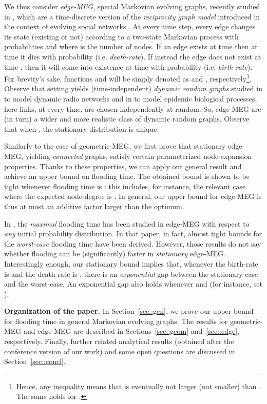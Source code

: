 \documentclass[10pt,a4paper]{article}
\begin{document}
We thus consider \emph{edge-MEG}, special Markovian evolving graphs, recently studied in \cite{CMMPS08,BCF09}, which are a time-discrete version of the \emph{reciprocity graph model} introduced in the context of evolving social networks \cite{W80}. At every time step, every edge changes its state (existing or not) according to a two-state Markovian process with probabilities  and  where  is the number of nodes. If an edge exists at time  then at time  it dies with probability  (i.e. \emph{death-rate}). If instead the edge does not exist at time , then it will come into existence at time  with probability  (i.e. \emph{birth-rate}). For brevity's sake, functions  and  will be simply denoted as  and , respectively\footnote{Hence, any inequality  means that  is eventually not larger (not smaller) than . The same holds for .}. Observe that setting  yields (time-independent) \emph{dynamic random graphs}   studied in \cite{CMPS07} to model dynamic radio networks and in \cite{BDW08} to model  epidemic biological  processes; here   links, at every time, are chosen independently at random. So, edge-MEG are (in turn) a wider and more realistic class of dynamic random graphs. Observe that when , the stationary distribution is unique.

Similarly to the case of geometric-MEG, we first prove that stationary edge-MEG, yielding \emph{connected} graphs, satisfy certain parameterized node-expansion properties. Thanks to these properties, we can apply our general result and achieve an upper bound on flooding time. The obtained bound is shown to be tight whenever flooding time is : this includes, for instance, the relevant case where the expected node-degree is . In general, our upper bound for edge-MEG is thus at most an  additive factor larger than the optimum.

In \cite{CMMPS08}, the \emph{maximal} flooding time has been studied  in edge-MEG with respect to \emph{any} initial probability distribution. In that paper, in fact, almost tight bounds for the \emph{worst-case} flooding time have been derived. However, those results do not say whether flooding can be (significantly) faster in \emph{stationary} edge-MEG. Interestingly enough, our stationary bound implies that, whenever the birth-rate  is  and the death-rate  is , there is an \emph{exponential} gap between the stationary case and the worst-case. An exponential gap also holds whenever  and  (for instance, set ).



\medskip \noindent \textbf{Organization of the paper.}
In Section~\ref{sec::gen}, we prove our upper bound for flooding time in general Markovian evolving graphs. The results for geometric-MEG and edge-MEG are described in Sections~\ref{sec::geom} and~\ref{sec::edge}, respectively. Finally, further related analytical results (obtained after the conference version of our work) and some open questions are discussed in Section~\ref{sec::concl}.
\end{document}
